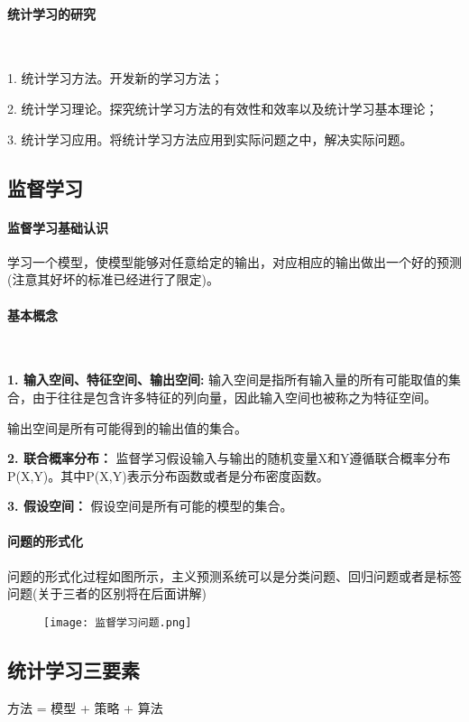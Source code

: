 \documentclass[UTF8]{ctexart}
\begin{document}
	\paragraph{统计学习的研究}

	~

	1. 统计学习方法。开发新的学习方法；

	2. 统计学习理论。探究统计学习方法的有效性和效率以及统计学习基本理论；

	3. 统计学习应用。将统计学习方法应用到实际问题之中，解决实际问题。
	\subsection{监督学习}
	\paragraph{监督学习基础认识}
	学习一个模型，使模型能够对任意给定的输出，对应相应的输出做出一个好的预测(注意其好坏的标准已经进行了限定)。

	\paragraph{基本概念}

	~

	\textbf{1. 输入空间、特征空间、输出空间:} 	 	输入空间是指所有输入量的所有可能取值的集合，由于往往是包含许多特征的列向量，因此输入空间也被称之为特征空间。

	输出空间是所有可能得到的输出值的集合。

	\textbf{2. 联合概率分布：} 		监督学习假设输入与输出的随机变量X和Y遵循联合概率分布P(X,Y)。其中P(X,Y)表示分布函数或者是分布密度函数。

	\textbf{3. 假设空间：} 		假设空间是所有可能的模型的集合。

	\paragraph{问题的形式化}
	问题的形式化过程如图所示，主义预测系统可以是分类问题、回归问题或者是标签问题(关于三者的区别将在后面讲解)

	\begin{figure}[!htb]
	\centering
	\texttt{[image: 监督学习问题.png]}
	\end{figure}

	\subsection{统计学习三要素}
	方法 = 模型 + 策略 + 算法
\end{document}
